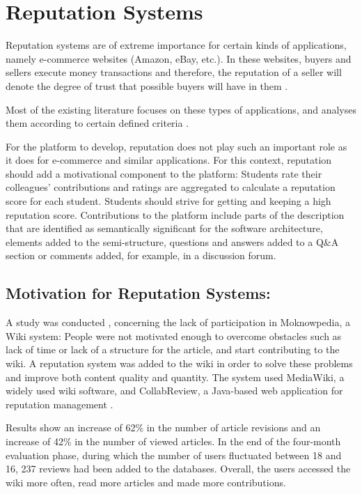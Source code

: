 \section{Reputation Systems}
\label{section:relatedWorkRepSys}
Reputation systems are of extreme importance for certain kinds of applications, namely e-commerce websites (Amazon, eBay, etc.). In these websites, buyers and sellers execute money transactions and therefore, the reputation of a seller will denote the degree of trust that possible buyers will have in them \cite{vavilis2014reference}.

Most of the existing literature focuses on these types of applications, and analyses them according to certain defined criteria \cite{vavilis2014reference,liu2010evaluation}.

For the platform to develop, reputation does not play such an important role as it does for e-commerce and similar applications. For this context, reputation should add a motivational component to the platform: Students rate their colleagues' contributions and ratings are aggregated to calculate a reputation score for each student. Students should strive for getting and keeping a high reputation score. Contributions to the platform include parts of the description that are identified as semantically significant for the software architecture, elements added to the semi-structure, questions and answers added to a Q\&A section or comments added, for example, in a discussion forum.

\subsection{Motivation for Reputation Systems:}

A study was conducted \cite{dencheva2011dynamic}, concerning the lack of participation in Moknowpedia, a Wiki system: People were not motivated enough to overcome obstacles such as lack of time or lack of a structure for the article, and start contributing to the wiki. A reputation system was added to the wiki in order to solve these problems and improve both content quality and quantity. The system used MediaWiki, a widely used wiki software, and CollabReview, a Java-based web application for reputation management \cite{prause2008approach}. 

Results show an increase of 62\% in the number of article revisions and an increase of 42\% in the number of viewed articles. In the end of the four-month evaluation phase, during which the number of users fluctuated between 18 and 16, 237 reviews had been added to the databases. Overall, the users accessed the wiki more often, read more articles and made more contributions. 

